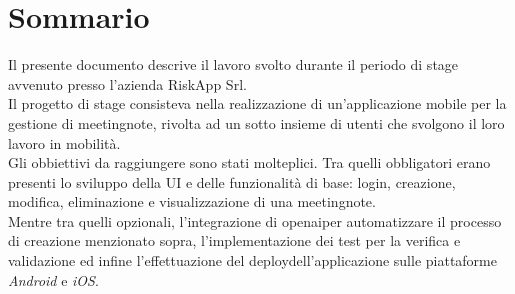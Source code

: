 \cleardoublepage
{}
{}
\begingroup
\let\clearpage\relax
\let\cleardoublepage\relax
\let\cleardoublepage\relax

\chapter*{Sommario}

Il presente documento descrive il lavoro svolto durante il periodo di stage avvenuto presso l'azienda RiskApp Srl. \\

\noindent Il progetto di stage consisteva nella realizzazione di un'applicazione mobile per la gestione di \gls{meetingnote}\glsoccur, rivolta ad un sotto insieme di utenti che svolgono il loro lavoro in mobilità. \\


\noindent Gli obbiettivi da raggiungere sono stati molteplici. Tra quelli obbligatori erano presenti lo sviluppo della UI e delle funzionalità di base: login, creazione, modifica, eliminazione e visualizzazione di una \gls{meetingnote}\glsoccur.\\
Mentre tra quelli opzionali, l'integrazione di \gls{openai}\glsoccur per automatizzare il processo di creazione menzionato sopra, l'implementazione dei test per la verifica e validazione ed infine l'effettuazione del \gls{deploy}\glsoccur dell'applicazione sulle piattaforme \emph{Android} e \emph{iOS}.\\




\endgroup

\vfill
